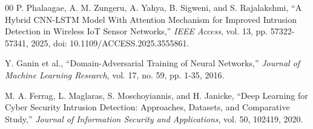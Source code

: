 \documentclass[conference]{IEEEtran}
\begin{document}
\begin{thebibliography}{00}
 P. Phalaagae, A. M. Zungeru, A. Yahya, B. Sigweni, and S. Rajalakshmi, ``A Hybrid CNN-LSTM Model With Attention Mechanism for Improved Intrusion Detection in Wireless IoT Sensor Networks,'' \textit{IEEE Access}, vol. 13, pp. 57322-57341, 2025, doi: 10.1109/ACCESS.2025.3555861.

 Y. Ganin et al., ``Domain-Adversarial Training of Neural Networks,'' \textit{Journal of Machine Learning Research}, vol. 17, no. 59, pp. 1-35, 2016.

 M. A. Ferrag, L. Maglaras, S. Moschoyiannis, and H. Janicke, ``Deep Learning for Cyber Security Intrusion Detection: Approaches, Datasets, and Comparative Study,'' \textit{Journal of Information Security and Applications}, vol. 50, 102419, 2020.

\end{thebibliography}

\vspace{12pt}
\end{document}
